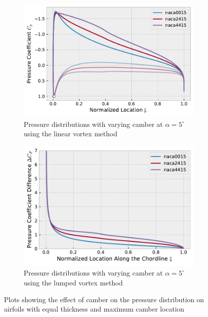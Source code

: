 \begin{figure}[h]
    \centering
    \begin{subfigure}{.5\textwidth}
      \centering
      \captionsetup{width=.8\linewidth}
      \includegraphics[width=.9\linewidth]{static/thick_camber_a5.pdf}
      \caption{\centering Pressure distributions with varying camber at $\alpha
      = 5^{\circ}$ using the linear vortex method}
      \label{fig:camber1}
    \end{subfigure}\hfill%
    \begin{subfigure}{.5\textwidth}
      \centering
      \captionsetup{width=.8\linewidth}
      \includegraphics[width=.9\linewidth]{static/thin_camber_a5.pdf}
      \caption{\centering Pressure distributions with varying camber at $\alpha
      = 5^{\circ}$ using the lumped vortex method}
      \label{fig:camber2}
    \end{subfigure}
    \caption{\centering Plots showing the effect of camber on the pressure distribution on airfoils with equal thickness and maximum camber location}
    \label{fig:camber}
\end{figure}

